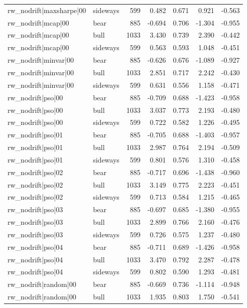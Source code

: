 \begin{table}
\begin{tabular}{llrrrrr}
rw\_nodrift|maxsharpe|00 & sideways & 599 & 0.482 & 0.671 & 0.921 & -0.563 \\
rw\_nodrift|mcap|00 & bear & 885 & -0.694 & 0.706 & -1.304 & -0.955 \\
rw\_nodrift|mcap|00 & bull & 1033 & 3.430 & 0.739 & 2.390 & -0.442 \\
rw\_nodrift|mcap|00 & sideways & 599 & 0.563 & 0.593 & 1.048 & -0.451 \\
rw\_nodrift|minvar|00 & bear & 885 & -0.626 & 0.676 & -1.089 & -0.927 \\
rw\_nodrift|minvar|00 & bull & 1033 & 2.851 & 0.717 & 2.242 & -0.430 \\
rw\_nodrift|minvar|00 & sideways & 599 & 0.631 & 0.556 & 1.158 & -0.471 \\
rw\_nodrift|pso|00 & bear & 885 & -0.709 & 0.688 & -1.423 & -0.958 \\
rw\_nodrift|pso|00 & bull & 1033 & 3.037 & 0.773 & 2.193 & -0.480 \\
rw\_nodrift|pso|00 & sideways & 599 & 0.722 & 0.582 & 1.226 & -0.495 \\
rw\_nodrift|pso|01 & bear & 885 & -0.705 & 0.688 & -1.403 & -0.957 \\
rw\_nodrift|pso|01 & bull & 1033 & 2.987 & 0.764 & 2.194 & -0.509 \\
rw\_nodrift|pso|01 & sideways & 599 & 0.801 & 0.576 & 1.310 & -0.458 \\
rw\_nodrift|pso|02 & bear & 885 & -0.717 & 0.696 & -1.438 & -0.960 \\
rw\_nodrift|pso|02 & bull & 1033 & 3.149 & 0.775 & 2.223 & -0.451 \\
rw\_nodrift|pso|02 & sideways & 599 & 0.713 & 0.584 & 1.215 & -0.465 \\
rw\_nodrift|pso|03 & bear & 885 & -0.697 & 0.685 & -1.380 & -0.955 \\
rw\_nodrift|pso|03 & bull & 1033 & 2.899 & 0.766 & 2.160 & -0.476 \\
rw\_nodrift|pso|03 & sideways & 599 & 0.726 & 0.575 & 1.237 & -0.480 \\
rw\_nodrift|pso|04 & bear & 885 & -0.711 & 0.689 & -1.426 & -0.958 \\
rw\_nodrift|pso|04 & bull & 1033 & 3.470 & 0.792 & 2.287 & -0.478 \\
rw\_nodrift|pso|04 & sideways & 599 & 0.802 & 0.590 & 1.293 & -0.481 \\
rw\_nodrift|random|00 & bear & 885 & -0.669 & 0.736 & -1.114 & -0.948 \\
rw\_nodrift|random|00 & bull & 1033 & 1.935 & 0.803 & 1.750 & -0.541 \\

\end{tabular}
\end{table}

